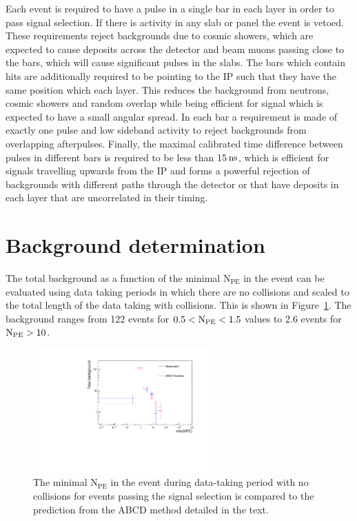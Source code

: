 \documentclass[12pt]{article}
\newcommand{\unit}[1]{\ensuremath{\text{\,#1}}\xspace}
\newcommand{\npe} {\mbox{\ensuremath{\textrm{N}_\textrm{PE}}}\xspace}
\begin{document}
Each event is required to have a pulse in
a single bar in each layer in order to pass signal selection. If there is activity in any slab or panel the event is 
vetoed. These requirements reject backgrounds due to cosmic showers, which are expected to cause deposits
across the detector and beam muons passing close to the bars, which will cause significant pulses in
the slabs. The bars which contain hits are additionally required to be pointing to the IP such that they 
have the same position which each layer. This reduces the background from neutrons, cosmic showers and random overlap
while being efficient for signal which is expected to have a small angular spread. In each bar a requirement is
made of exactly one pulse and low sideband activity to reject backgrounds from overlapping afterpulses. Finally, the
maximal calibrated time difference between pulses in different bars is required to be less than 15\unit{ns}, which is 
efficient for signals travelling upwards from the IP and forms a powerful rejection of backgrounds
with different paths through the detector or that have deposits 
in each layer that are uncorrelated in their timing.


\section{Background determination}

The total background as a function of the minimal \npe in the event can be evaluated 
using data taking periods in which there are no collisions and scaled to the 
total length of the data taking with collisions. This is shown in Figure~\ref{fig:bkgNoBeam}.
The background ranges from 122 events for $0.5 < \npe < 1.5$ values to 2.6 events for $\npe > 10$.

\begin{figure}[ht!]
    \centering
    \includegraphics[width=0.6\textwidth]{figures/backgroundYieldsNoBeam_15ns_07}
    \caption{\label{fig:bkgNoBeam} The minimal \npe in the event during data-taking period with 
    no collisions for events passing the signal selection is
   compared to the prediction from the ABCD method detailed in the text.}
\end{figure}
\end{document}
